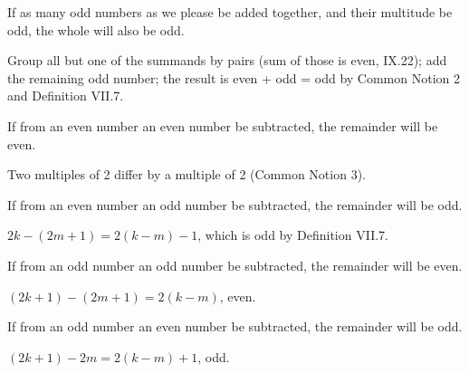 \documentclass{rrxiv}
\begin{document}
\begin{claim}
\label{prop:IX.23}
If as many odd numbers as we please be added together, and their
multitude be odd, the whole will also be odd.
\end{claim}
\begin{evidence}[Proof of IX.23]
\label{ev:IX.23}
Group all but one of the summands by pairs (sum of those is even,
IX.22); add the remaining odd number; the result is even + odd =
odd by Common Notion 2 and Definition VII.7.
\end{evidence}

\begin{claim}
\label{prop:IX.24}
If from an even number an even number be subtracted, the remainder
will be even.
\end{claim}
\begin{evidence}[Proof of IX.24]
\label{ev:IX.24}
Two multiples of 2 differ by a multiple of 2 (Common Notion 3).
\end{evidence}

\begin{claim}
\label{prop:IX.25}
If from an even number an odd number be subtracted, the remainder
will be odd.
\end{claim}
\begin{evidence}[Proof of IX.25]
\label{ev:IX.25}
$2k - (2m+1) = 2(k-m) - 1$, which is odd by Definition VII.7.
\end{evidence}

\begin{claim}
\label{prop:IX.26}
If from an odd number an odd number be subtracted, the remainder will
be even.
\end{claim}
\begin{evidence}[Proof of IX.26]
\label{ev:IX.26}
$(2k+1) - (2m+1) = 2(k-m)$, even.
\end{evidence}

\begin{claim}
\label{prop:IX.27}
If from an odd number an even number be subtracted, the remainder
will be odd.
\end{claim}
\begin{evidence}[Proof of IX.27]
\label{ev:IX.27}
$(2k+1) - 2m = 2(k-m) + 1$, odd.
\end{evidence}
\end{document}
